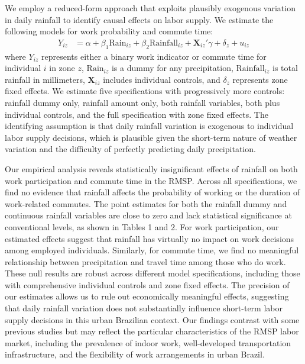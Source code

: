 We employ a reduced-form approach that exploits plausibly exogenous variation in daily rainfall to identify causal effects on labor supply. We estimate the following models for work probability and commute time:
\begin{align*}
Y_{iz} &= \alpha + \beta_1 \text{Rain}_{iz} + \beta_2 \text{Rainfall}_{iz} + \mathbf{X}_{iz}'\gamma + \delta_z + u_{iz}
\end{align*}
where $Y_{iz}$ represents either a binary work indicator or commute time for individual $i$ in zone $z$, $\text{Rain}_{iz}$ is a dummy for any precipitation, $\text{Rainfall}_{iz}$ is total rainfall in millimeters, $\mathbf{X}_{iz}$ includes individual controls, and $\delta_z$ represents zone fixed effects. We estimate five specifications with progressively more controls: rainfall dummy only, rainfall amount only, both rainfall variables, both plus individual controls, and the full specification with zone fixed effects. The identifying assumption is that daily rainfall variation is exogenous to individual labor supply decisions, which is plausible given the short-term nature of weather variation and the difficulty of perfectly predicting daily precipitation.

Our empirical analysis reveals statistically insignificant effects of rainfall on both work participation and commute time in the RMSP. Across all specifications, we find no evidence that rainfall affects the probability of working or the duration of work-related commutes. The point estimates for both the rainfall dummy and continuous rainfall variables are close to zero and lack statistical significance at conventional levels, as shown in Tables 1 and 2. For work participation, our estimated effects suggest that rainfall has virtually no impact on work decisions among employed individuals. Similarly, for commute time, we find no meaningful relationship between precipitation and travel time among those who do work. These null results are robust across different model specifications, including those with comprehensive individual controls and zone fixed effects. The precision of our estimates allows us to rule out economically meaningful effects, suggesting that daily rainfall variation does not substantially influence short-term labor supply decisions in this urban Brazilian context. Our findings contrast with some previous studies but may reflect the particular characteristics of the RMSP labor market, including the prevalence of indoor work, well-developed transportation infrastructure, and the flexibility of work arrangements in urban Brazil.

